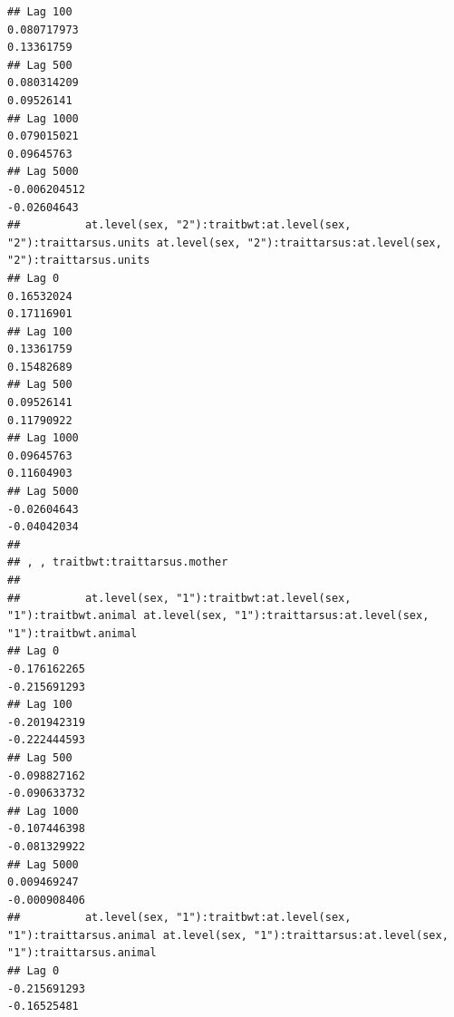 \documentclass[
  12pt,
]{book}
\begin{document}
\begin{verbatim}
## Lag 100                                                    0.080717973                                                       0.13361759
## Lag 500                                                    0.080314209                                                       0.09526141
## Lag 1000                                                   0.079015021                                                       0.09645763
## Lag 5000                                                  -0.006204512                                                      -0.02604643
##          at.level(sex, "2"):traitbwt:at.level(sex, "2"):traittarsus.units at.level(sex, "2"):traittarsus:at.level(sex, "2"):traittarsus.units
## Lag 0                                                          0.16532024                                                          0.17116901
## Lag 100                                                        0.13361759                                                          0.15482689
## Lag 500                                                        0.09526141                                                          0.11790922
## Lag 1000                                                       0.09645763                                                          0.11604903
## Lag 5000                                                      -0.02604643                                                         -0.04042034
## 
## , , traitbwt:traittarsus.mother
## 
##          at.level(sex, "1"):traitbwt:at.level(sex, "1"):traitbwt.animal at.level(sex, "1"):traittarsus:at.level(sex, "1"):traitbwt.animal
## Lag 0                                                      -0.176162265                                                      -0.215691293
## Lag 100                                                    -0.201942319                                                      -0.222444593
## Lag 500                                                    -0.098827162                                                      -0.090633732
## Lag 1000                                                   -0.107446398                                                      -0.081329922
## Lag 5000                                                    0.009469247                                                      -0.000908406
##          at.level(sex, "1"):traitbwt:at.level(sex, "1"):traittarsus.animal at.level(sex, "1"):traittarsus:at.level(sex, "1"):traittarsus.animal
## Lag 0                                                         -0.215691293                                                          -0.16525481

\end{verbatim}
\end{document}
